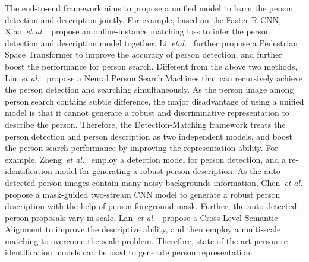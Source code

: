 \documentclass[journal]{IEEEtran}
\begin{document}
The end-to-end framework aims to propose a unified model to learn the person detection and description jointly. 
For example, based on the Faster R-CNN, Xiao~\emph{et al.}~\cite{XiaoLWLW17} propose an online-instance matching loss to infer the person detection and description model together.
Li~\emph{etal.}~\cite{LiYC18} further propose a Pedestrian Space Transformer to improve the accuracy of person detection, and further boost the performance for person search. 
Different from the above two methods, Liu~\emph{et al.}~\cite{LiuFJKZQJY17} propose a Neural Person Search Machines that can recursively achieve the person detection and searching simultaneously.
As the person image among person search contains subtle difference, the major disadvantage of using a unified model is that it cannot generate a robust and discriminative representation to describe the person. 
Therefore, the Detection-Matching framework treats the person detection and person description as two independent models, and boost the person search performance by improving the representation ability. 
For example, Zheng~\emph{et al.}~\cite{ZhengZSCYT17} employ a detection model for person detection, and a re-identification model for generating a robust person description. 
As the auto-detected person images contain many noisy backgrounds information, Chen~\emph{et al.}\cite{ChenZOYT18} propose a mask-guided two-stream CNN model to generate a robust person description with the help of person foreground mask. Further, the auto-detected person proposals vary in scale, Lan~\emph{et al.}~\cite{LanZG18} propose a Cross-Level Semantic Alignment to improve the descriptive ability, and then employ a multi-scale matching to overcome the scale problem. Therefore,  state-of-the-art person re-identification models can be used to generate person representation. 
\end{document}
